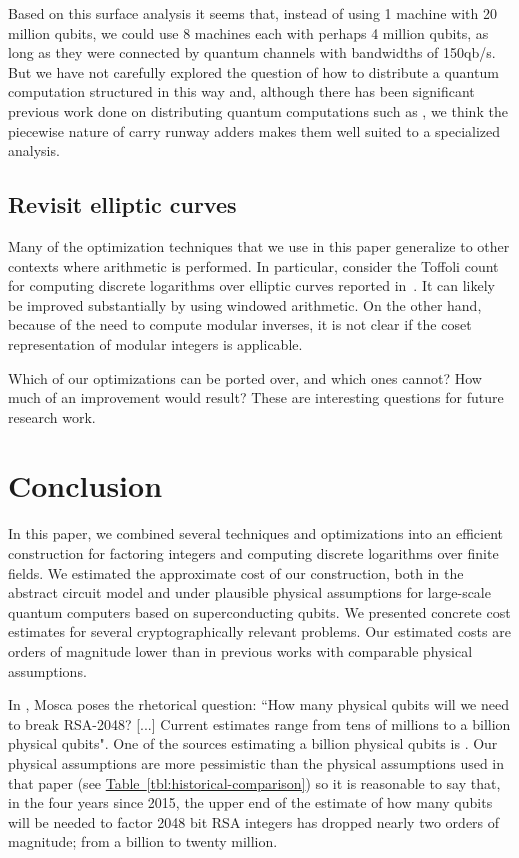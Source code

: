\documentclass[superscriptaddress,notitlepage,longbibliography]{revtex4-1}
\theoremstyle{definition}
\theoremstyle{definition}
\newcommand{\tbl}[1]{\hyperref[tbl:#1]{Table~\ref*{tbl:#1}}}
\begin{document}
Based on this surface analysis it seems that, instead of using 1 machine with 20 million qubits, we could use 8 machines each with perhaps 4 million qubits, as long as they were connected by quantum channels with bandwidths of 150qb/s.
But we have not carefully explored the question of how to distribute a quantum computation structured in this way and, although there has been significant previous work done on distributing quantum computations such as \cite{meter2008arithmetic,oi2006scalable,jiang2010scalable}, we think the piecewise nature of carry runway adders makes them well suited to a specialized analysis.

\subsection{Revisit elliptic curves}
\label{sec:revisit-elliptic-curves}

Many of the optimization techniques that we use in this paper generalize to other contexts where arithmetic is performed.
In particular, consider the Toffoli count for computing discrete logarithms over elliptic curves reported in~\cite{roetteler2017quantum}.
It can likely be improved substantially by using windowed arithmetic.
On the other hand, because of the need to compute modular inverses, it is not clear if the coset representation of modular integers is applicable.

Which of our optimizations can be ported over, and which ones cannot?
How much of an improvement would result?
These are interesting questions for future research work.




\section{Conclusion}
\label{sec:conclusion}

In this paper, we combined several techniques and optimizations into an efficient construction for factoring integers and computing discrete logarithms over finite fields.
We estimated the approximate cost of our construction, both in the abstract circuit model and under plausible physical assumptions for large-scale quantum computers based on superconducting qubits.
We presented concrete cost estimates for several cryptographically relevant problems.
Our estimated costs are orders of magnitude lower than in previous works with comparable physical assumptions.

In \cite{mosca2018cybersecurity}, Mosca poses the rhetorical question: ``How many physical qubits will we need to break RSA-2048? [...] Current estimates range from tens of millions to a billion physical qubits".
One of the sources estimating a billion physical qubits is \cite{fowler2012surfacecodereview}.
Our physical assumptions are more pessimistic than the physical assumptions used in that paper (see \tbl{historical-comparison}) so it is reasonable to say that, in the four years since 2015, the upper end of the estimate of how many qubits will be needed to factor 2048 bit RSA integers has dropped nearly two orders of magnitude; from a billion to twenty million.
\end{document}
